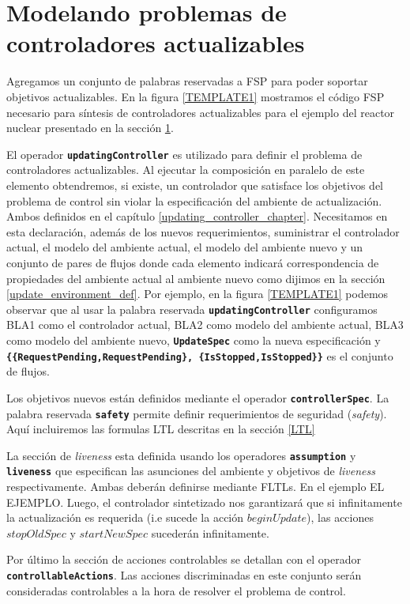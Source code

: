\section{Modelando problemas de controladores actualizables}

Agregamos un conjunto de palabras reservadas a FSP para poder soportar objetivos actualizables. En la figura
\ref{TEMPLATE1} mostramos el código FSP necesario para síntesis de controladores actualizables para el ejemplo del reactor nuclear
presentado en la sección \ref{}.

El operador \texttt{\textbf{updatingController}} es utilizado para definir el problema de controladores
actualizables. Al ejecutar la composición en paralelo de este elemento obtendremos, si existe, un controlador que satisface los
objetivos del problema de control sin violar la especificación del ambiente de actualización. Ambos definidos en el
capítulo \ref{updating_controller_chapter}. Necesitamos en esta declaración, además de los nuevos requerimientos, suministrar
el controlador actual, el modelo del ambiente actual, el modelo del ambiente nuevo y un conjunto de pares de flujos
donde cada elemento indicará correspondencia de propiedades del ambiente actual al ambiente nuevo como dijimos en la sección
\ref{update_environment_def}. Por ejemplo, en la figura \ref{TEMPLATE1} podemos observar que
al usar la palabra reservada \texttt{\textbf{updatingController}} configuramos BLA1 como el controlador actual, BLA2
como modelo del ambiente actual, BLA3 como modelo del ambiente nuevo, \texttt{\textbf{UpdateSpec}} como la nueva
especificación y \texttt{\textbf{\{\{RequestPending,RequestPending\}, \{IsStopped,IsStopped\}\}}} es el conjunto de
flujos.

Los objetivos nuevos están definidos mediante el operador \texttt{\textbf{controllerSpec}}. La palabra reservada
\texttt{\textbf{safety}} permite definir requerimientos de seguridad (\emph{safety}). Aquí incluiremos las formulas
LTL descritas en la sección \ref{LTL}

La sección de \emph{liveness} esta definida usando los operadores \texttt{\textbf{assumption}} y
\texttt{\textbf{liveness}} que especifican las asunciones del ambiente y objetivos de \emph{liveness} respectivamente.
Ambas deberán definirse mediante FLTLs. En el ejemplo EL EJEMPLO. Luego, el controlador sintetizado nos garantizará que
si infinitamente la actualización es requerida (i.e sucede la acción $beginUpdate$), las acciones $stopOldSpec$ y
$startNewSpec$ sucederán infinitamente.

Por último la sección de acciones controlables se detallan con el operador \texttt{\textbf{controllableActions}}. Las
acciones discriminadas en este conjunto serán consideradas controlables a la hora de resolver el problema de control.
